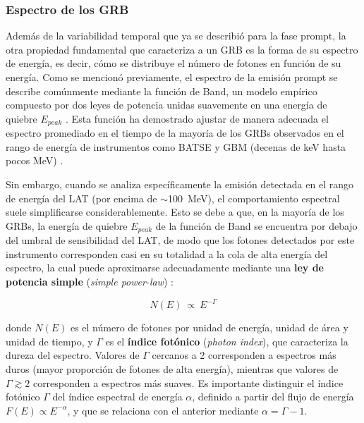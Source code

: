 \subsubsection{Espectro de los GRB}

Además de la variabilidad temporal que ya se describió para la fase prompt, la otra propiedad fundamental que caracteriza a un GRB es la forma de su espectro de energía, es decir, cómo se distribuye el número de fotones en función de su energía. Como se mencionó previamente, el espectro de la emisión prompt se describe comúnmente mediante la función de Band, un modelo empírico compuesto por dos leyes de potencia unidas suavemente en una energía de quiebre $E_{peak}$ \cite{Band1993}. Esta función ha demostrado ajustar de manera adecuada el espectro promediado en el tiempo de la mayoría de los GRBs observados en el rango de energía de instrumentos como BATSE y GBM (decenas de keV hasta pocos MeV) \cite{Preece2000}.

Sin embargo, cuando se analiza específicamente la emisión detectada en el rango de energía del LAT (por encima de $\sim$100~MeV), el comportamiento espectral suele simplificarse considerablemente. Esto se debe a que, en la mayoría de los GRBs, la energía de quiebre $E_{peak}$ de la función de Band se encuentra por debajo del umbral de sensibilidad del LAT, de modo que los fotones detectados por este instrumento corresponden casi en su totalidad a la cola de alta energía del espectro, la cual puede aproximarse adecuadamente mediante una \textbf{ley de potencia simple} (\textit{simple power-law}) \cite{Ackermann2013}:

\begin{equation}
    N(E) \ \propto \ E^{-\Gamma}
\end{equation}

donde $N(E)$ es el número de fotones por unidad de energía, unidad de área y unidad de tiempo, y $\Gamma$ es el \textbf{índice fotónico} (\textit{photon index}), que caracteriza la dureza del espectro. Valores de $\Gamma$ cercanos a 2 corresponden a espectros más duros (mayor proporción de fotones de alta energía), mientras que valores de $\Gamma \gtrsim 2$ corresponden a espectros más suaves. Es importante distinguir el índice fotónico $\Gamma$ del índice espectral de energía $\alpha$, definido a partir del flujo de energía $F(E) \propto E^{-\alpha}$, y que se relaciona con el anterior mediante $\alpha = \Gamma - 1$.

